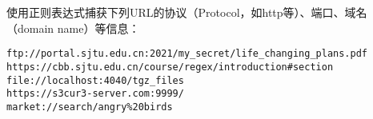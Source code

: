 \documentclass[addpoints,12pt,answers]{exam}
\begin{document}
\begin{CJK*}{UTF8}{gbsn}
\begin{questions}
\question[5]
使用正则表达式捕获下列URL的协议（Protocol，如http等）、端口、域名（domain name）等信息：
\begin{lstlisting}
ftp://portal.sjtu.edu.cn:2021/my_secret/life_changing_plans.pdf
https://cbb.sjtu.edu.cn/course/regex/introduction#section
file://localhost:4040/tgz_files
https://s3cur3-server.com:9999/
market://search/angry%20birds
\end{lstlisting}
\begin{solution}
\vspace{2in}
\end{solution}


\end{questions}

\end{CJK*}
\end{document}
